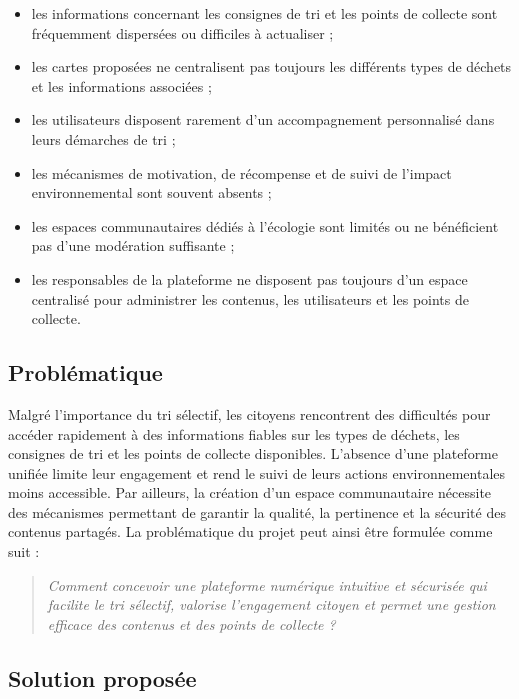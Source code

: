 \begin{itemize}
    \item les informations concernant les consignes de tri et les points de collecte sont fréquemment dispersées ou difficiles à actualiser ;
    \item les cartes proposées ne centralisent pas toujours les différents types de déchets et les informations associées ;
    \item les utilisateurs disposent rarement d'un accompagnement personnalisé dans leurs démarches de tri ;
    \item les mécanismes de motivation, de récompense et de suivi de l'impact environnemental sont souvent absents ;
    \item les espaces communautaires dédiés à l'écologie sont limités ou ne bénéficient pas d'une modération suffisante ;
    \item les responsables de la plateforme ne disposent pas toujours d'un espace centralisé pour administrer les contenus, les utilisateurs et les points de collecte.
\end{itemize}

\subsection{Problématique}

Malgré l'importance du tri sélectif, les citoyens rencontrent des difficultés pour accéder rapidement à des informations fiables sur les types de déchets, les consignes de tri et les points de collecte disponibles. L'absence d'une plateforme unifiée limite leur engagement et rend le suivi de leurs actions environnementales moins accessible. Par ailleurs, la création d'un espace communautaire nécessite des mécanismes permettant de garantir la qualité, la pertinence et la sécurité des contenus partagés. La problématique du projet peut ainsi être formulée comme suit :

\begin{quote}
\textit{Comment concevoir une plateforme numérique intuitive et sécurisée qui facilite le tri sélectif, valorise l'engagement citoyen et permet une gestion efficace des contenus et des points de collecte ?}
\end{quote}

\subsection{Solution proposée}

